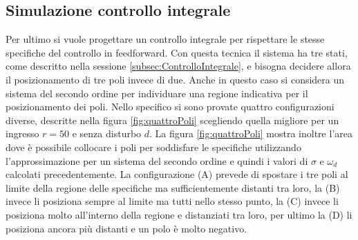 	\subsection{Simulazione controllo integrale}
	\label{subsec:ItegraleSim}	
		
		Per ultimo si vuole progettare un controllo integrale per rispettare le stesse specifiche del controllo in feedforward. Con questa tecnica il sistema ha tre stati, come descritto nella sessione \ref{subsec:ControlloIntegrale}, e bisogna decidere allora il posizionamento di tre poli invece di due. Anche in questo caso si considera un sistema del secondo ordine per individuare una regione indicativa per il posizionamento dei poli. Nello specifico si sono provate quattro configurazioni diverse, descritte nella figura \ref{fig:quattroPoli} scegliendo quella migliore per un ingresso $r=50$ e senza disturbo $d$. La figura \ref{fig:quattroPoli} mostra inoltre l'area dove è possibile collocare i poli per soddisfare le specifiche utilizzando l'approssimazione per un sistema del secondo ordine e quindi i valori di $\sigma$ e $\omega_d$ calcolati precedentemente. La configurazione (A) prevede di spostare i tre poli al limite della regione delle specifiche ma sufficientemente distanti tra loro, la (B) invece li posiziona sempre al limite ma tutti nello stesso punto, la (C) invece li posiziona molto all'interno della regione e distanziati tra loro, per ultimo la (D) li posiziona ancora più distanti e un polo è molto negativo.
		
